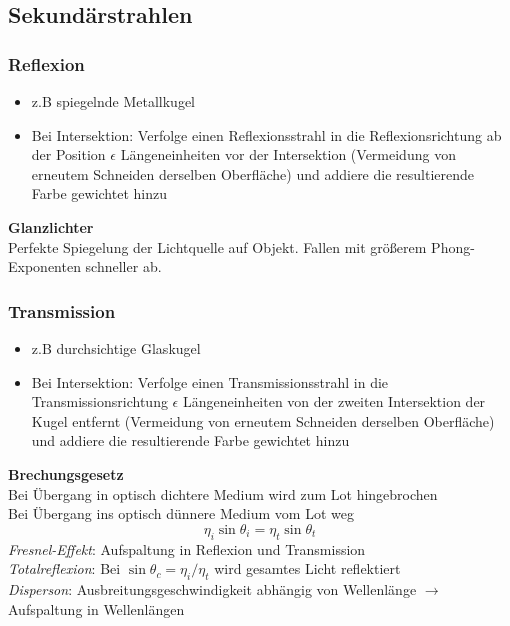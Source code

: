 \documentclass[10pt,a4paper]{article}
\begin{document}
	\subsection{Sekundärstrahlen}
	\label{rt:sub:sekundaerstrahlen}
	
	\subsubsection{Reflexion}
        \label{rt:ssub:reflexion}
        
        \begin{itemize}
        \item z.B spiegelnde Metallkugel
        \item Bei Intersektion: Verfolge einen Reflexionsstrahl in die Reflexionsrichtung ab der Position $\epsilon$ Längeneinheiten vor der Intersektion (Vermeidung von erneutem Schneiden derselben Oberfläche) und addiere die resultierende Farbe gewichtet hinzu
        \end{itemize}

        \textbf{Glanzlichter}\\
        Perfekte Spiegelung der Lichtquelle auf Objekt. Fallen mit größerem Phong-Exponenten schneller ab.

        \subsubsection{Transmission}
        \label{rt:ssub:transmission}
        
        \begin{itemize}
        \item z.B durchsichtige Glaskugel
        \item Bei Intersektion: Verfolge einen Transmissionsstrahl in die Transmissionsrichtung $\epsilon$ Längeneinheiten von der zweiten Intersektion der Kugel entfernt (Vermeidung von erneutem Schneiden derselben Oberfläche) und addiere die resultierende Farbe gewichtet hinzu
        \end{itemize}
        \textbf{Brechungsgesetz}\\
        Bei Übergang in optisch dichtere Medium wird zum Lot hingebrochen\\
        Bei Übergang ins optisch dünnere Medium vom Lot weg\\
        $$\eta_i \sin \theta_i = \eta_t \sin \theta_t$$
        \textit{Fresnel-Effekt}: Aufspaltung in Reflexion und Transmission\\
        \textit{Totalreflexion}: Bei $\sin \theta_c = \eta_i / \eta_t$ wird gesamtes Licht reflektiert\\
        \textit{Disperson}: Ausbreitungsgeschwindigkeit abhängig von Wellenlänge $\rightarrow$ Aufspaltung in Wellenlängen
        
\end{document}
